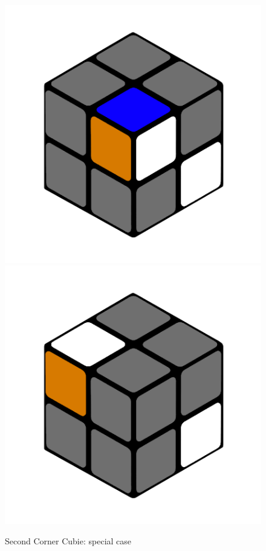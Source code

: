 \documentclass[12pt,a4paper]{article}
\theoremstyle{custom}
\begin{document}
\begin{figure}[H]
\includegraphics[scale=0.16]{e1_s2_s3_s.png}
\includegraphics[scale=0.16]{e1_s2_s4_s.png}
\caption{Second Corner Cubie: special case}
\label{Figure_SecondCornercubie2}
\end{figure}
\end{document}
